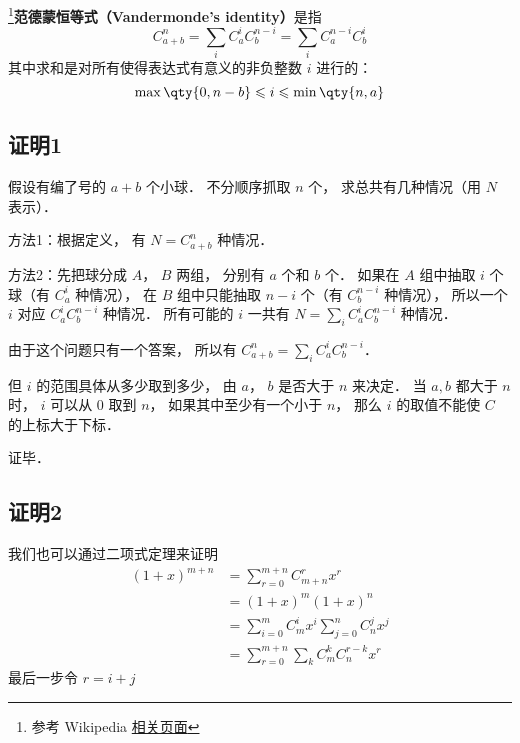 

\footnote{参考 Wikipedia \href{https://en.wikipedia.org/wiki/Vandermonde's_identity}{相关页面}}\textbf{范德蒙恒等式（Vandermonde's identity）}是指
\begin{equation}
C_{a + b}^n = \sum_i C_a^i C_b^{n-i} = \sum\limits_i C_a^{n-i}C_b^i
\end{equation}
其中求和是对所有使得表达式有意义的非负整数 $i$ 进行的：
\begin{equation}
\max\qty{0, n-b} \leqslant i \leqslant \min\qty{n, a}
\end{equation}

\subsection{证明1}

假设有编了号的 $a+b$ 个小球． 不分顺序抓取 $n$ 个， 求总共有几种情况（用 $N$ 表示）．

方法1：根据定义， 有 $N = C_{a+b}^n$ 种情况．

方法2：先把球分成 $A$，  $B$ 两组， 分别有 $a$ 个和 $b$ 个． 如果在 $A$ 组中抽取 $i$ 个球（有 $C_a^i$ 种情况）， 在 $B$ 组中只能抽取  $n - i$ 个（有 $C_b^{n-i}$ 种情况）， 所以一个 $i$ 对应 $C_a^i C_b^{n-i}$ 种情况． 所有可能的 $i$ 一共有 $N = \sum_i C_a^i C_b^{n-i}$ 种情况．

由于这个问题只有一个答案， 所以有 $C_{a+b}^n = \sum_i C_a^i C_b^{n-i}$． 

但 $i$ 的范围具体从多少取到多少， 由 $a$，  $b$ 是否大于 $n$ 来决定． 当 $a,b$ 都大于 $n$ 时， $i$ 可以从 0 取到 $n$，  如果其中至少有一个小于 $n$，  那么 $i$ 的取值不能使 $C$ 的上标大于下标．

证毕．

\subsection{证明2}
我们也可以通过二项式定理来证明
\begin{equation}
\begin{aligned}
(1 + x)^{m+n} &= \sum_{r=0}^{m+n} C_{m+n}^r x^r\\
&=(1+x)^m (1+x)^n\\
&=\sum_{i=0}^m C_m^i x^i  \sum_{j=0}^n C_n^j x^j\\
&=\sum_{r=0}^{m+n} \sum_{k} C_m^k C_n^{r-k} x^r
\end{aligned}
\end{equation}
最后一步令 $r = i+j$
